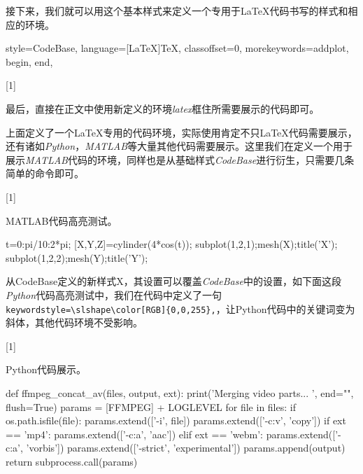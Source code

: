 接下来，我们就可以用这个基本样式来定义一个专用于\LaTeX 代码书写的样式和相应的环境。

\begin{latex}
{
    style=CodeBase,
    language=[LaTeX]TeX,
    classoffset=0,
    morekeywords={addplot, begin, end},
}

[1]{\lstset{style=LaTeX}}{}
\end{latex}

最后，直接在正文中使用新定义的环境\emph{latex}框住所需要展示的代码即可。

上面定义了一个\LaTeX 专用的代码环境，实际使用肯定不只\LaTeX 代码需要展示，还有诸如\emph{Python}，\emph{MATLAB}等大量其他代码需要展示。这里我们在定义一个用于展示\emph{MATLAB}代码的环境，同样也是从基础样式\emph{CodeBase}进行衍生，只需要几条简单的命令即可。

\begin{latex}

[1]{\lstset{style=Matlab}}{}
\end{latex}

MATLAB代码高亮测试。

\begin{Matlab}{}
t=0:pi/10:2*pi;
[X,Y,Z]=cylinder(4*cos(t));
subplot(1,2,1);mesh(X);title('X');
subplot(1,2,2);mesh(Y);title('Y');
\end{Matlab}

从CodeBase定义的新样式X，其设置可以覆盖\emph{CodeBase}中的设置，如下面这段\emph{Python}代码高亮测试中，我们在代码中定义了一句\verb|keywordstyle=\slshape\color[RGB]{0,0,255},|，让Python代码中的关键词变为斜体，其他代码环境不受影响。

\begin{latex}
[1]{\lstset{style=python}}{}
\end{latex}

Python代码展示。

\begin{python}{}
def ffmpeg_concat_av(files, output, ext):
    print('Merging video parts... ', end="", flush=True)
    params = [FFMPEG] + LOGLEVEL
    for file in files:
        if os.path.isfile(file): params.extend(['-i', file])
    params.extend(['-c:v', 'copy'])
    if ext == 'mp4':
        params.extend(['-c:a', 'aac'])
    elif ext == 'webm':
        params.extend(['-c:a', 'vorbis'])
    params.extend(['-strict', 'experimental'])
    params.append(output)
    return subprocess.call(params)
\end{python}

